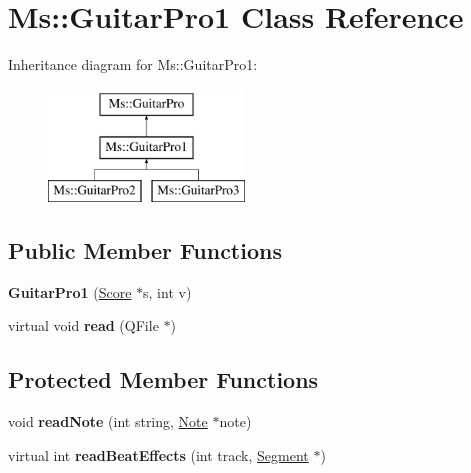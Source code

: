 \hypertarget{class_ms_1_1_guitar_pro1}{}\section{Ms\+:\+:Guitar\+Pro1 Class Reference}
\label{class_ms_1_1_guitar_pro1}
Inheritance diagram for Ms\+:\+:Guitar\+Pro1\+:\begin{figure}[H]
\begin{center}
\leavevmode
\includegraphics[height=3.000000cm]{class_ms_1_1_guitar_pro1}
\end{center}
\end{figure}
\subsection*{Public Member Functions}
\begin{DoxyCompactItemize}
\item 
\mbox{\label{class_ms_1_1_guitar_pro1_abf7c7fa18c39e2328bf7495aa294e26a}} 
{\bfseries Guitar\+Pro1} (\hyperlink{class_ms_1_1_score}{Score} $\ast$s, int v)
\item 
\mbox{\label{class_ms_1_1_guitar_pro1_ad4e6afd7587845a9b3be275f42ce922b}} 
virtual void {\bfseries read} (Q\+File $\ast$)
\end{DoxyCompactItemize}
\subsection*{Protected Member Functions}
\begin{DoxyCompactItemize}
\item 
\mbox{\label{class_ms_1_1_guitar_pro1_ae0623f3f4f798cee4c541aca9d4f6364}} 
void {\bfseries read\+Note} (int string, \hyperlink{class_ms_1_1_note}{Note} $\ast$note)
\item 
\mbox{\label{class_ms_1_1_guitar_pro1_a5568d01cd84035efbdcaf114203b0a83}} 
virtual int {\bfseries read\+Beat\+Effects} (int track, \hyperlink{class_ms_1_1_segment}{Segment} $\ast$)
\end{DoxyCompactItemize}
